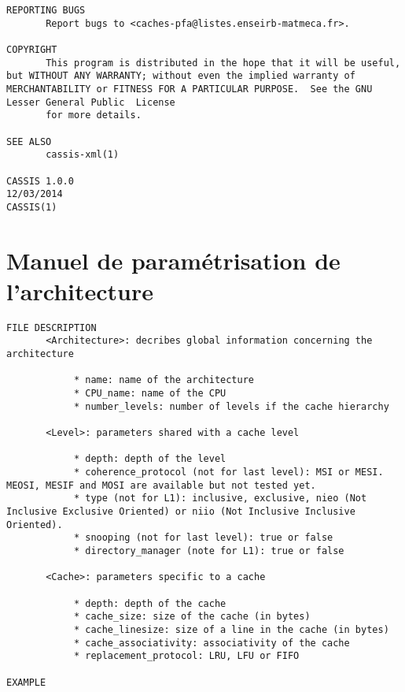 \begin{lstlisting}[style=styleMan]
REPORTING BUGS
       Report bugs to <caches-pfa@listes.enseirb-matmeca.fr>.

COPYRIGHT
       This program is distributed in the hope that it will be useful, but WITHOUT ANY WARRANTY; without even the implied warranty of MERCHANTABILITY or FITNESS FOR A PARTICULAR PURPOSE.  See the GNU Lesser General Public  License
       for more details.

SEE ALSO
       cassis-xml(1)

CASSIS 1.0.0                                                                                                  12/03/2014                                                                                                     CASSIS(1)
\end{lstlisting}
\newpage
\section{Manuel de paramétrisation de l'architecture}
\label{manarchi}
\begin{lstlisting}[style=styleMan]
FILE DESCRIPTION
       <Architecture>: decribes global information concerning the architecture

            * name: name of the architecture
            * CPU_name: name of the CPU
            * number_levels: number of levels if the cache hierarchy

       <Level>: parameters shared with a cache level

            * depth: depth of the level
            * coherence_protocol (not for last level): MSI or MESI. MEOSI, MESIF and MOSI are available but not tested yet.
            * type (not for L1): inclusive, exclusive, nieo (Not Inclusive Exclusive Oriented) or niio (Not Inclusive Inclusive Oriented).
            * snooping (not for last level): true or false
            * directory_manager (note for L1): true or false

       <Cache>: parameters specific to a cache

            * depth: depth of the cache
            * cache_size: size of the cache (in bytes)
            * cache_linesize: size of a line in the cache (in bytes)
            * cache_associativity: associativity of the cache
            * replacement_protocol: LRU, LFU or FIFO

EXAMPLE
\end{lstlisting}
